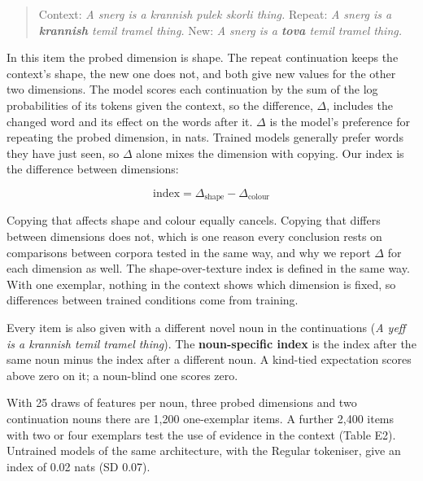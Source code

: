 \begin{quote}
Context: \emph{A snerg is a krannish pulek skorli thing.} Repeat: \emph{A snerg is a \textbf{krannish} temil tramel thing.} New: \emph{A snerg is a \textbf{tova} temil tramel thing.}
\end{quote}

In this item the probed dimension is shape. The repeat continuation keeps the context's shape, the new one does not, and both give new values for the other two dimensions. The model scores each continuation by the sum of the log probabilities of its tokens given the context, so the difference, $\Delta$, includes the changed word and its effect on the words after it. $\Delta$ is the model's preference for repeating the probed dimension, in nats. Trained models generally prefer words they have just seen, so $\Delta$ alone mixes the dimension with copying. Our index is the difference between dimensions:

\begin{equation*}
\text{index} = \Delta_{\text{shape}} - \Delta_{\text{colour}}
\end{equation*}

Copying that affects shape and colour equally cancels. Copying that differs between dimensions does not, which is one reason every conclusion rests on comparisons between corpora tested in the same way, and why we report $\Delta$ for each dimension as well. The shape-over-texture index is defined in the same way. With one exemplar, nothing in the context shows which dimension is fixed, so differences between trained conditions come from training.

Every item is also given with a different novel noun in the continuations (\emph{A yeff is a krannish temil tramel thing}). The \textbf{noun-specific index} is the index after the same noun minus the index after a different noun. A kind-tied expectation scores above zero on it; a noun-blind one scores zero.

With 25 draws of features per noun, three probed dimensions and two continuation nouns there are 1,200 one-exemplar items. A further 2,400 items with two or four exemplars test the use of evidence in the context (Table E2). Untrained models of the same architecture, with the Regular tokeniser, give an index of 0.02 nats (SD 0.07).

